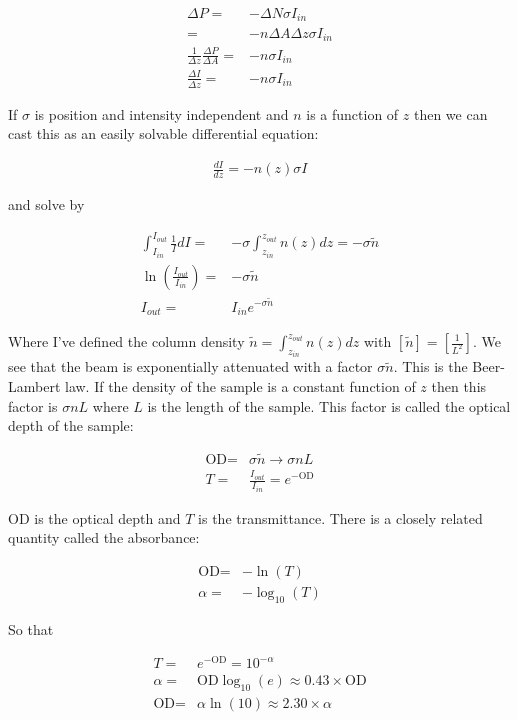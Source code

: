 \documentclass[12pt]{article}
\begin{document}
\begin{align}
\Delta P =& - \Delta N \sigma I_{in}\\
=& - n \Delta A \Delta z \sigma I_{in}\\
\frac{1}{\Delta z} \frac{\Delta P}{\Delta A} =& -n \sigma I_{in}\\
\frac{\Delta I}{\Delta z} =& - n \sigma I_{in}
\end{align}

If $\sigma$ is position and intensity independent and $n$ is a function of $z$ then we can cast this as an easily solvable differential equation:

\begin{align}
\frac{dI}{dz} = -n(z)\sigma I
\end{align}

and solve by

\begin{align}
\int_{I_{in}}^{I_{out}} \frac{1}{I} dI =& -\sigma \int_{z_{in}}^{z_{out}} n(z) dz = -\sigma \tilde{n}\\
\ln\left(\frac{I_{out}}{I_{in}}\right) =& -\sigma \tilde{n}\\
I_{out} =& I_{in} e^{-\sigma \tilde{n}}
\end{align}

Where I've defined the column density $\tilde{n} = \int_{z_{in}}^{z_{out}} n(z) dz$ with $[\tilde{n}] = \left[\frac{1}{L^2}\right]$.
We see that the beam is exponentially attenuated with a factor $\sigma \tilde{n}$.
This is the Beer-Lambert law.
If the density of the sample is a constant function of $z$ then this factor is $\sigma n L$ where $L$ is the length of the sample.
This factor is called the optical depth of the sample:

\begin{align}
\text{OD} =& \sigma \tilde{n} \rightarrow \sigma n L\\
T =& \frac{I_{out}}{I_{in}} = e^{-\text{OD}}
\end{align}

$\text{OD}$ is the optical depth and $T$ is the transmittance.
There is a closely related quantity called the absorbance:

\begin{align}
\text{OD} =& -\ln\left(T\right)\\
\alpha =& -\log_{10}\left(T\right)
\end{align}

So that

\begin{align}
T =& e^{-\text{OD}} = 10^{-\alpha}\\
\alpha =& \text{OD} \log_{10}(e) \approx 0.43 \times \text{OD}\\
\text{OD} =& \alpha \ln(10) \approx 2.30 \times \alpha
\end{align}
\end{document}
